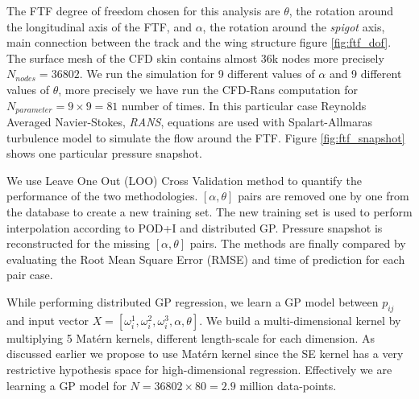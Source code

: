 The FTF degree of freedom chosen for this analysis are $\theta$, the rotation around the longitudinal axis of the FTF, and $\alpha$, the rotation around the {\it spigot} axis, main connection between the track and the wing structure figure \ref{fig:ftf_dof}. The surface mesh of the CFD skin contains almost 36k nodes more precisely $N_{nodes} = 36802$. We run the simulation for 9 different values of $\alpha$ and 9 different values of $\theta$, more precisely we have run the CFD-Rans computation for $N_{parameter} = 9\times9 = 81$ number of times. In this particular case Reynolds Averaged  Navier-Stokes, {\it RANS}, equations are used with Spalart-Allmaras turbulence model to simulate the flow around the FTF. Figure \ref{fig:ftf_snapshot} shows one particular pressure snapshot. 

We use Leave One Out (LOO) Cross Validation method to quantify the performance of the two methodologies. $[\alpha, \theta]$ pairs are removed one by one from the database to create a new training set. The new training set is used to perform interpolation according to POD+I and distributed GP. Pressure snapshot is reconstructed for the missing $[\alpha, \theta]$ pairs. The methods are finally compared by evaluating the Root Mean Square Error (RMSE) and time of prediction for each pair case. 

While performing distributed GP regression, we learn a GP model between $p_{ij}$ and input vector $X = [\omega_{i}^{1}, \omega_{i}^{2}, \omega_{i}^{3}, \alpha, \theta]$. We build a multi-dimensional kernel by multiplying 5 Mat\'ern kernels, different length-scale for each dimension. As discussed earlier we propose to use Mat\'ern kernel since the SE kernel has a very restrictive hypothesis space for high-dimensional regression.  Effectively we are learning a GP model for $N = 36802\times80 = 2.9$ million data-points. 

